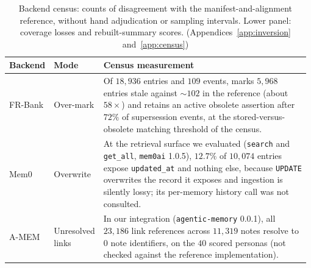 \documentclass{article}
\newcommand{\censusalias}{\label{tab:believed}}
\begin{document}
\begin{table}[h]
\caption{Backend census: counts of disagreement with the manifest-and-alignment reference, without hand adjudication or sampling intervals. Lower panel: coverage losses and rebuilt-summary scores. (Appendices~\ref{app:inversion} and~\ref{app:census})}
\label{tab:census}\censusalias%
\centering
\scriptsize
\setlength{\tabcolsep}{2pt}
\begin{tabular}{@{}p{0.10\linewidth}p{0.08\linewidth}p{0.80\linewidth}@{}}
\toprule
Backend & Mode & Census measurement \\
\midrule
FR-Bank & Over-mark & Of $18{,}936$ entries and $109$ events, marks $5{,}968$ entries stale against ${\sim}102$ in the reference (about $58\times$) and retains an active obsolete assertion after $72\%$ of supersession events, at the stored-versus-obsolete matching threshold of the census. \\
Mem0 & Overwrite & At the retrieval surface we evaluated (\texttt{search} and \texttt{get\_all}, \texttt{mem0ai} 1.0.5), $12.7\%$ of $10{,}074$ entries expose \texttt{updated\_at} and nothing else, because \texttt{UPDATE} overwrites the record it exposes and ingestion is silently lossy; its per-memory history call was not consulted. \\
A-MEM & Unresolved links & In our integration (\texttt{agentic-memory} 0.0.1), all $23{,}186$ link references across $11{,}319$ notes resolve to $0$ note identifiers, on the $40$ scored personas (not checked against the reference implementation). \\
\bottomrule
\end{tabular}
\par\vspace{4pt}

\end{table}
\end{document}
